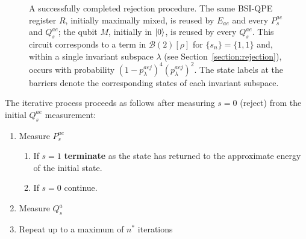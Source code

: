 \documentclass[aps,floatfix,10pt,amssymb,amsfont,amsmath,superscriptaddress,float,nofootinbib,longbibliography,nobalancelastpage,twocolumn]{revtex4-2}
\begin{document}
\begin{figure}
\caption{A successfully completed rejection procedure. The same BSI-QPE register $R$, initially maximally mixed, is reused by $E_{ae}$ and every $P_s^{ae}$ and $Q_s^{ae}$; the qubit $M$, initially in $\ket{0}$, is reused by every $Q_s^{ae}$. This circuit corresponds to a term in $\mathcal{B}(2)[\rho]$ for $\{s_n\}=\{1,1\}$ and, within a single invariant subspace $\lambda$ (see Section~\ref{section:rejection}), occurs with probability $(1-p^{aej}_{\lambda})^4(p^{aej}_{\lambda})^2$. The state labels at the barriers denote the corresponding states of each invariant subspace.}
\label{fig:fullcircuit}
\end{figure}

The iterative process proceeds as follows after measuring $s=0$ (reject) from the initial $Q_s^{ae}$ measurement: 
\begin{enumerate}
    \item Measure $P_s^{ae}$
        \begin{enumerate}
            \item If $s=1$ \textbf{terminate} as the state has returned to the approximate energy of the initial state.
            \item If $s=0$ continue.
        \end{enumerate}
    \item Measure $Q_s^a$
    \item Repeat up to a maximum of $n^*$ iterations
\end{enumerate}
\end{document}
